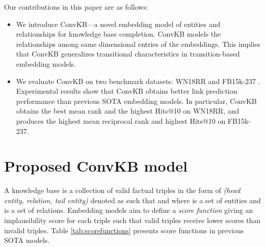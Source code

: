 \documentclass[11pt,a4paper]{article}
\begin{document}
Our contributions in this paper are as follows:
\begin{itemize}


\item We introduce ConvKB---a novel embedding model of entities and relationships for knowledge base completion. 
ConvKB models the relationships among same dimensional entries of the embeddings. This implies that ConvKB generalizes transitional characteristics in  transition-based embedding  models.

\item We evaluate ConvKB  on two benchmark datasets: WN18RR \citep{Dettmers2017} and FB15k-237 \citep{toutanova-chen:2015:CVSC}.  Experimental results show that ConvKB obtains better link prediction performance than previous SOTA embedding models. In particular,   ConvKB obtains the best mean rank  and the highest Hits@10 on WN18RR, and produces the highest mean reciprocal rank and  highest Hits@10 on FB15k-237. 

\end{itemize}


\begin{table}[!t]
\centering
\setlength{\tabcolsep}{0.4em}
\def\arraystretch{1.05}
\caption{The score functions in previous SOTA  models and in our ConvKB model.  denotes the -norm of .  =  denotes a tri-linear dot product.  denotes a non-linear function.  denotes a convolution operator.  denotes a dot product.  denotes a concatenation operator.  denotes a 2D reshaping of .  denotes a set of filters.}
\label{tab:scorefunctions}
\end{table}


\section{Proposed ConvKB model}
\label{sec:model}

A knowledge base  is a collection of valid factual triples in the form of \textit{(head entity, relation, tail entity)} denoted as  such that  and  where  is a set of entities and  is a set of relations.
Embedding models aim to define a \textit{score function}  giving an implausibility score for each triple  such that valid  triples receive lower scores than invalid triples.
Table \ref{tab:scorefunctions} presents score functions in previous SOTA models.
\end{document}
